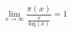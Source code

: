     \begin{center}
        \begin{equation*}
            \lim_{x \to \infty}
            \frac{\pi(x)}{\frac{x}{\text{log}(x)}} = 1
        \end{equation*}
    \end{center}
